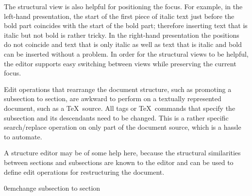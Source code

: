 \documentclass{speauth}
\begin{document}
\bc
The structural view is also helpful for positioning the focus. For example, in the left-hand presentation, the start of the first piece of italic text just before the bold part coincides with the start of the bold part; therefore inserting text that is italic but not bold is rather tricky. In the right-hand presentation the positions do not coincide and text that is only italic as well as text that is italic and bold can be inserted without a problem. In order for the structural views to be helpful, the editor supports easy switching between views while preserving the current focus.
\ec



Edit operations that rearrange the document structure, such as promoting a subsection to section, are awkward to perform on a textually represented document, such as a \TeX\ source. All tags or \TeX\ commands that specify the subsection and its descendants need to be changed. This is a rather specific search/replace operation on only part of the document source, which is a hassle to automate.

A structure editor may be of some help here, because the structural similarities between sections and subsections are known to the editor and can be used to define edit operations for restructuring the document.

{0em}{\small change subsection to section}
 
\end{document}
